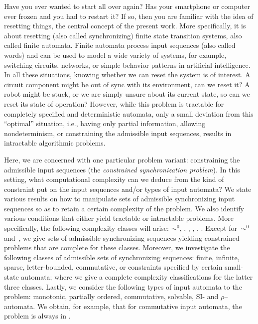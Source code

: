 


Have you ever wanted to start all over again? Has your smartphone or computer ever frozen and you had to restart it? 
If so, then you are familiar with the idea of resetting things,
the central concept of the present work.  
More specifically, it is about resetting (also called synchronizing) 
finite state transition systems, also called finite automata. 
 Finite automata process input sequences (also called words) and can be used to model a wide variety of systems, for example,
switching circuits, networks, or simple
behavior patterns in artificial intelligence. 
In all these situations, knowing whether we can reset the system is of interest. A circuit component might be out of sync with its environment, can we reset it? 
A robot might be stuck, or we are simply unsure about its current state,
so can we reset its state of operation? 
However, while this problem is tractable
for completely specified and deterministic automata,
only a small deviation from this ``optimal'' situation, i.e., having only partial information, allowing nondeterminism, or constraining the admissible input
sequences, results in intractable
algorithmic problems.

Here, we are concerned with one particular problem variant: 
constraining the admissible input
sequences (the \emph{constrained synchronization problem}).
In this setting, what computational complexity can we deduce 
from the kind of constraint put on the input sequences and/or
types of input automata?
We state various results on how to manipulate sets of admissible synchronizing input sequences
so as to retain a certain complexity of the problem.
We also identify various conditions 
that either yield tractable or intractable problems.
More specifically, the following complexity classes will arise: 
$\AC^0$, \LOGSPACE, \NL, \PTIME, \NP, \PSPACE.
Except for~$\AC^0$ and~\PTIME, we 
give sets of admissible synchronizing sequences
yielding constrained problems that are complete for these classes.
Moreover, we investigate the following classes
of admissible sets of synchronizing sequences: finite, infinite, sparse, letter-bounded, commutative, or
constraints specified by certain small-state automata; where we give
a complete complexity classifications for the latter three classes.
Lastly, we  consider the following types of input automata to the problem:
monotonic, partially ordered, commutative, solvable, SI- and $\rho$--automata.
We obtain, for example, that for commutative input automata, the problem is always in \PTIME.

